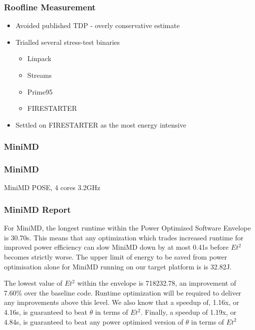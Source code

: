 \documentclass{beamer}
\begin{document}
  \begin{frame}
    \frametitle{Roofline Measurement}
    \begin{itemize}
      \item Avoided published TDP - overly conservative estimate
      \item Trialled several stress-test binaries
      \begin{itemize}
        \item Linpack
        \item Streams
        \item Prime95
        \item FIRESTARTER
      \end{itemize}
      \item Settled on FIRESTARTER as the most energy intensive
    \end{itemize}
  \end{frame}

  \begin{frame}
    \frametitle{MiniMD}
    \begin{figure}
    \providecommand{\plotwidth}{.8\linewidth}
    
    \end{figure}
  \end{frame}
  \begin{frame}
    \frametitle{MiniMD}
    \begin{table}
    
    \caption{MiniMD POSE, 4 cores 3.2GHz}
    \end{table} 
  \end{frame}

  \begin{frame}
    \frametitle{MiniMD Report}
    For MiniMD, the longest runtime within the Power Optimized Software Envelope is 30.70s.
    This means that any optimization which trades increased runtime for improved power efficiency can slow MiniMD down by at most 0.41s before $Et^2$ becomes strictly worse.
    The upper limit of energy to be saved from power optimisation alone for MiniMD running on our target platform is is 32.82J.

    The lowest value of $Et^2$ within the envelope is 718232.78, an improvement of 7.60\% over the baseline code. 
    Runtime optimization will be required to deliver any improvements above this level.
    We also know that a speedup of, 1.16x, or 4.16s, is guaranteed to beat $\theta$ in terms of $Et^2$.
    Finally, a speedup of 1.19x, or 4.84s, is guaranteed to beat any power optimised version of $\theta$ in terms of $Et^2$
  \end{frame}
\end{document}
